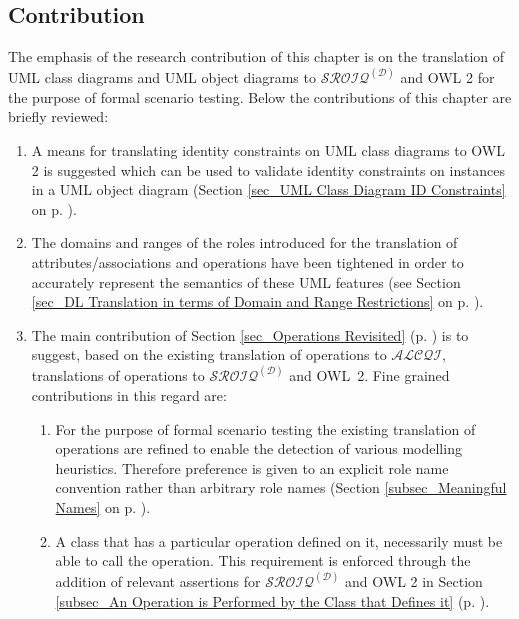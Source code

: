 \subsection{Contribution} \label{subsec_DLTranslationFormalScenrioTesting_Contribution}
The emphasis of the research contribution of this chapter is on the translation of UML class diagrams and UML object diagrams to $\mathcal{SROIQ}^{(\mathcal{D})}$ and OWL 2 for the purpose of formal 
scenario testing. Below the contributions of this chapter are briefly reviewed:

\begin{enumerate}
 \item A means for translating identity constraints on UML class diagrams to OWL 2 is suggested which can be used to validate identity constraints on instances in a
UML object diagram (Section \ref{sec_UML Class Diagram ID Constraints} on p. \pageref{sec_UML Class Diagram ID Constraints}). 
 \item The domains and ranges of the roles introduced for the translation of 
 attributes/associations and operations have been tightened in order to accurately represent the 
 semantics of these UML features (see Section \ref{sec_DL Translation in terms of Domain and Range Restrictions} 
 on p. \pageref{sec_DL Translation in terms of Domain and Range Restrictions}).
 \item The main contribution of Section \ref{sec_Operations Revisited} (p. \pageref{sec_Operations Revisited}) is to suggest, based on the existing translation of operations to $\mathcal{ALCQI}$, 
 translations of operations to $\mathcal{SROIQ}^{(\mathcal{D})}$ and OWL~2. Fine grained contributions 
 in this regard are:
 \begin{enumerate}
 \item  For the purpose of formal scenario testing the existing translation of operations are refined to enable the detection of various modelling
 heuristics. Therefore preference is given to an explicit role name convention rather than arbitrary role names (Section \ref{subsec_Meaningful Names} on p. \pageref{subsec_Meaningful Names}). 
 \item A class that has a particular operation defined on it, necessarily must be able to call the operation. This requirement is enforced through the addition of
 relevant assertions for $\mathcal{SROIQ}^{(\mathcal{D})}$ and OWL 2 in Section \ref{subsec_An Operation is Performed by the Class that Defines it} 
 (p. \pageref{subsec_An Operation is Performed by the Class that Defines it}).

\end{enumerate}
\end{enumerate}
